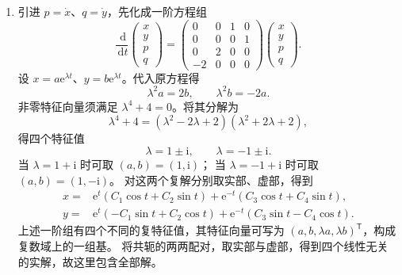 \documentclass[UTF8,a4paper,11pt]{ctexart}
\newcommand{\dd}{\,\mathrm d}
\newcommand{\e}{\mathrm e}
\begin{document}
\begin{solution}
\begin{enumerate}[label=(\arabic*)]
\item 引进 $p=\dot x$、$q=\dot y$，先化成一阶方程组
\[
\frac{\dd}{\dd t}\begin{pmatrix}x\\y\\p\\q\end{pmatrix}
=\begin{pmatrix}
0&0&1&0\\0&0&0&1\\0&2&0&0\\-2&0&0&0
\end{pmatrix}
\begin{pmatrix}x\\y\\p\\q\end{pmatrix}.
\]
设 $x=a\e^{\lambda t}$、$y=b\e^{\lambda t}$。代入原方程得
\[
\lambda^2a=2b,\qquad \lambda^2b=-2a.
\]
非零特征向量须满足 $\lambda^4+4=0$。将其分解为
\[
\lambda^4+4=(\lambda^2-2\lambda+2)(\lambda^2+2\lambda+2),
\]
得四个特征值
\[
\lambda=1\pm\mathrm i,\qquad \lambda=-1\pm\mathrm i.
\]
当 $\lambda=1+\mathrm i$ 时可取 $(a,b)=(1,\mathrm i)$；
当 $\lambda=-1+\mathrm i$ 时可取 $(a,b)=(1,-\mathrm i)$。
对这两个复解分别取实部、虚部，得到
\[
\boxed{
\begin{aligned}
x={}&\e^t(C_1\cos t+C_2\sin t)
+\e^{-t}(C_3\cos t+C_4\sin t),\\
y={}&\e^t(-C_1\sin t+C_2\cos t)
+\e^{-t}(C_3\sin t-C_4\cos t).
\end{aligned}}
\]
上述一阶组有四个不同的复特征值，其特征向量可写为
$(a,b,\lambda a,\lambda b)^{\mathsf T}$，构成复数域上的一组基。
将共轭的两两配对，取实部与虚部，得到四个线性无关的实解，故这里包含全部解。
\end{enumerate}
\end{solution}
\end{document}

